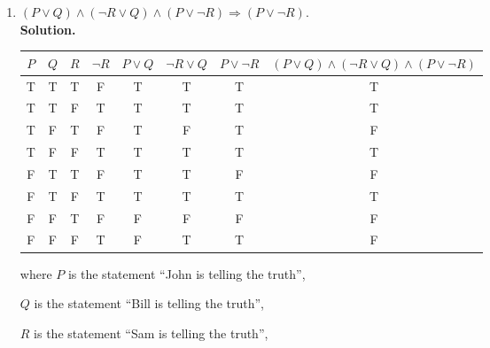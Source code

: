 \documentclass{report}
\newcommand{\sol}{\vspace{1em}\\\textbf{Solution.}\vspace{0.5em}}
\begin{document}
\begin{enumerate}[leftmargin=*]
\begin{enumerate}
              \item $(P \vee Q) \wedge (\neg R \vee Q) \wedge
                        (P \vee \neg R) \Rightarrow (P \vee \neg R)$.
                    \sol{}
                    \begin{center}
                        \begin{tabular}{cccccccc}
                            $P$ & $Q$ & $R$ & $\neg R$ & $P \vee Q$ & $\neg R \vee Q$ & $P \vee \neg R$ & $(P \vee Q) \wedge (\neg R \vee Q) \wedge (P \vee \neg R)$ \\
                            \hline
                            T   & T   & T   & F        & T          & T               & T               & T                                                          \\
                            T   & T   & F   & T        & T          & T               & T               & T                                                          \\
                            T   & F   & T   & F        & T          & F               & T               & F                                                          \\
                            T   & F   & F   & T        & T          & T               & T               & T                                                          \\
                            F   & T   & T   & F        & T          & T               & F               & F                                                          \\
                            F   & T   & F   & T        & T          & T               & T               & T                                                          \\
                            F   & F   & T   & F        & F          & F               & F               & F                                                          \\
                            F   & F   & F   & T        & F          & T               & T               & F
                        \end{tabular}
                    \end{center}
                    where $P$ is the statement ``John is telling the truth'',

                    $Q$ is the statement ``Bill is telling the truth'',

                    $R$ is the statement ``Sam is telling the truth'',\\


\end{enumerate}
\end{enumerate}
\end{document}
